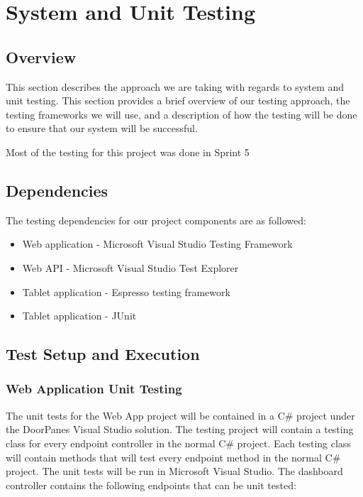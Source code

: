 
\chapter{System  and Unit Testing}

\section{Overview}
This section describes the approach we are taking with regards to system and unit testing. This section provides a brief overview of our testing approach, the testing frameworks we will use, and a description of how the testing will be done to ensure that our system will be successful.

Most of the testing for this project was done in Sprint 5

\section{Dependencies}
The testing dependencies for our project components are as followed:
\begin{itemize}
\item Web application - Microsoft Visual Studio Testing Framework
\item Web API - Microsoft Visual Studio Test Explorer
\item Tablet application - Espresso testing framework
\item Tablet application - JUnit
\end{itemize}


\section{Test Setup and Execution}

\subsection{Web Application Unit Testing}
The unit tests for the Web App project will be contained in a C\# project under the DoorPanes Visual Studio solution. The testing project will contain a testing class for every endpoint controller in the normal C\# project. Each testing class will contain methods that will test every endpoint method in the normal C\# project. The unit tests will be run in Microsoft Visual Studio. The dashboard controller contains the following endpoints that can be unit tested:

